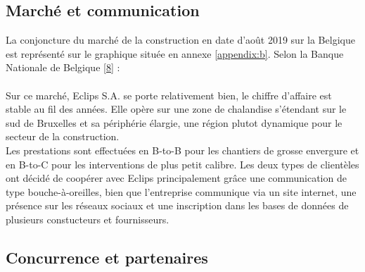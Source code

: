\documentclass[a4paper, 12pt]{article}
\begin{document}
\subsection{Marché et communication}

La conjoncture du marché de la construction en date d'août 2019 sur la Belgique est représenté sur le graphique située en annexe \ref{appendix:b}. Selon la Banque Nationale de Belgique \href{https://www.nbb.be/doc/dq/f/dq3/histo/pfc1908.pdf}{[8]} : \\
\fg\\

Sur ce marché, Eclips S.A. se porte relativement bien, le chiffre d'affaire est stable au fil des années. 
Elle opère sur une zone de chalandise s'étendant sur le sud de Bruxelles et sa périphérie élargie, une région plutot dynamique pour le secteur de la construction.\\

Les prestations sont effectuées en B-to-B pour les chantiers de grosse envergure et en B-to-C pour les interventions de plus petit calibre. Les deux types de clientèles ont décidé de coopérer avec Eclips principalement grâce une communication de type \og bouche-à-oreilles\fg, bien que l'entreprise communique via un site internet, une présence sur les réseaux sociaux et une inscription dans les bases de données de plusieurs constucteurs et fournisseurs.

\subsection{Concurrence et partenaires}
\end{document}
